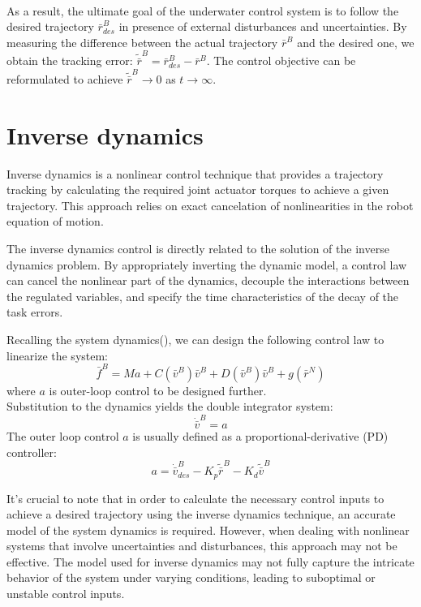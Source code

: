     \\
    As a result, the ultimate goal of the underwater control system is to follow the desired 
    trajectory ${\bar r}_{des}^B$ in presence of external disturbances and uncertainties.
    By measuring the difference between the actual trajectory ${ \bar r }^B$ and the 
    desired one, we obtain the tracking error:
    $
        {\tilde{\bar r}}^B = {\bar r}_{des}^B - {\bar r}^B
    $.
    The control objective can be reformulated to achieve ${\tilde{\bar r}}^B\rightarrow 0 $ 
    as $t\rightarrow \infty$.

\section{Inverse dynamics}

    Inverse dynamics is a nonlinear control technique that provides a trajectory tracking
    by calculating the required joint actuator torques to achieve a given trajectory. 
    This approach relies on exact cancelation of nonlinearities in the robot equation of motion.

    The inverse dynamics control is directly related to the solution of the inverse
    dynamics problem. By appropriately inverting the dynamic model, a control law can 
    cancel the nonlinear part of the dynamics, decouple the interactions 
    between the regulated variables, and specify the time characteristics of the decay of the 
    task errors.

    Recalling the system dynamics(), we can design the following control law to 
    linearize the system:
    $$
        \bar{f}^B = M {a} +
        C(\bar{v}^B)\bar{v}^B +
        D(\bar{v}^B)\bar{v}^B +
        g(\bar{r}^N)
    $$
    where ${a}$ is outer-loop control to be designed further. \\
    Substitution to the dynamics yields the double integrator system:
    $$\dot{\bar{v}}^B = a$$
    The outer loop control $a$ is usually defined as a proportional-derivative (PD) controller:
    $$a = \dot{\bar{v}}^B_{des} - K_p \tilde{{\bar{r}}}^B - K_d \tilde{{\bar{v}}}^B$$

    It's crucial to note that in order to calculate the necessary control inputs to achieve 
    a desired trajectory using the inverse dynamics technique, an accurate model of the 
    system dynamics is required. However, when dealing with nonlinear systems that involve 
    uncertainties and disturbances, this approach may not be effective. The model used for 
    inverse dynamics may not fully capture the intricate behavior of the system under 
    varying conditions, leading to suboptimal or unstable control inputs. 
    
